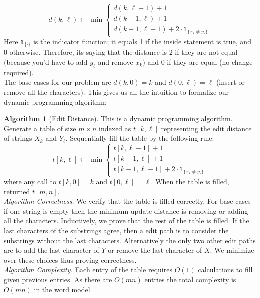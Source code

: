 \documentclass[10pt]{article}
\theoremstyle{plain}
\theoremstyle{definition}
\newtheorem{alg}[thm]{Algorithm}
\newcommand{\One}[1]{\mathds{1}_{\{ #1 \}}}
\numberwithin{equation}{section}
\numberwithin{figure}{section}
\begin{document}
\begin{equation}
d(k,\ell) \leftarrow \min \begin{cases} d(k, \ell - 1) + 1 \\ d(k - 1, \ell) + 1\\ d(k-1, \ell - 1) + 2 \cdot \One{x_k \neq y_\ell} \end{cases}
\end{equation} 
Here $\One{\cdot}$ is the indicator function; it equals 1 if the inside statement is true, and 0 otherwise. Therefore, its saying that the distance is 2 if they are not equal (because you'd have to add $y_\ell$ and remove $x_k$) and 0 if they are equal (no change required). \\

\noindent The base cases for our problem are $d(k,0) = k$ and $d(0,\ell) = \ell$ (insert or remove all the characters). This gives us all the intuition to formalize our dynamic programming algorithm:

\begin{alg}[Edit Distance]
This is a dynamic programming algorithm. Generate a table of size $m \times n$ indexed as $t[k,\ell]$ representing the edit distance of strings $X_k$ and $Y_\ell$. Sequentially fill the table by the following rule:
\begin{equation}
t[k,\ell] \leftarrow \min \begin{cases} t[k, \ell - 1] + 1\\ t[k - 1, \ell] + 1 \\ t[k-1, \ell - 1] + 2 \cdot \One{x_k \neq y_\ell} \end{cases}
\end{equation}
where any call to $t[k,0] = k$ and $t[0,\ell] = \ell$. When the table is filled, returned $t[m,n]$. \\

\noindent \textit{Algorithm Correctness.} We verify that the table is filled correctly. For base cases if one string is empty then the minimum update distance is removing or adding all the characters. Inductively, we prove that the rest of the table is filled. If the last characters of the substrings agree, then a edit path is to consider the substrings without the last characters. Alternatively the only two other edit paths are to add the last character of $Y$ or remove the last character of $X$. We minimize over these choices thus proving correctness. \\

\noindent \textit{Algorithm Complexity.} Each entry of the table requires $O(1)$ calculations to fill given previous entries. As there are $O(mn)$ entries the total complexity is $O(mn)$ in the word model.
\end{alg}
\end{document}
